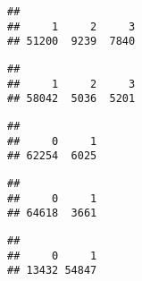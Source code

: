 \documentclass[
]{article}
\newenvironment{Shaded}{\begin{snugshade}}{\end{snugshade}}
\newcommand{\FunctionTok}[1]{\textcolor[rgb]{0.13,0.29,0.53}{\textbf{#1}}}
\newcommand{\NormalTok}[1]{#1}
\newcommand{\SpecialCharTok}[1]{\textcolor[rgb]{0.81,0.36,0.00}{\textbf{#1}}}
\begin{document}
\begin{verbatim}
## 
##     1     2     3 
## 51200  9239  7840
\end{verbatim}

\begin{Shaded}
\end{Shaded}

\begin{verbatim}
## 
##     1     2     3 
## 58042  5036  5201
\end{verbatim}

\begin{Shaded}
\end{Shaded}

\begin{verbatim}
## 
##     0     1 
## 62254  6025
\end{verbatim}

\begin{Shaded}
\end{Shaded}

\begin{verbatim}
## 
##     0     1 
## 64618  3661
\end{verbatim}

\begin{Shaded}
\end{Shaded}

\begin{verbatim}
## 
##     0     1 
## 13432 54847
\end{verbatim}

\begin{Shaded}
\end{Shaded}
\end{document}
